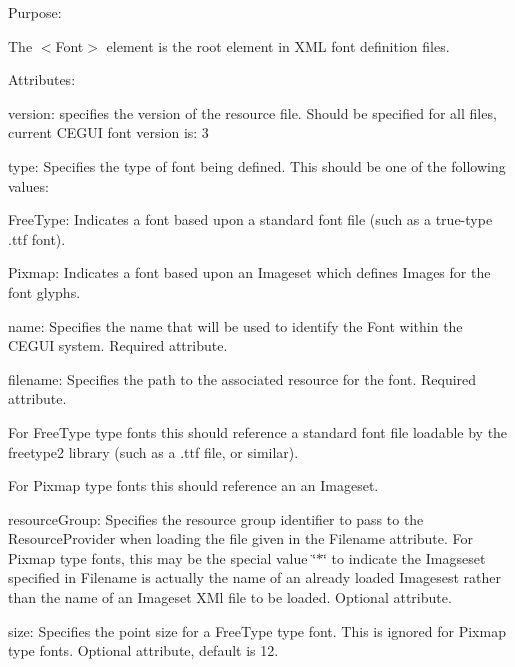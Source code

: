\begin{DoxyItemize}
\item Purpose\+:
\begin{DoxyItemize}
\item The $<$Font$>$ element is the root element in X\+ML font definition files.
\end{DoxyItemize}
\item Attributes\+:
\begin{DoxyItemize}
\item {\ttfamily version\+:} specifies the version of the resource file. Should be specified for all files, current C\+E\+G\+UI font version is\+: 3
\item {\ttfamily type\+:} Specifies the type of font being defined. This should be one of the following values\+:
\begin{DoxyItemize}
\item {\ttfamily Free\+Type\+:} Indicates a font based upon a standard font file (such as a true-\/type \textquotesingle{}.ttf\textquotesingle{} font).
\item {\ttfamily Pixmap\+:} Indicates a font based upon an Imageset which defines Images for the font glyphs.
\end{DoxyItemize}
\item {\ttfamily name\+:} Specifies the name that will be used to identify the Font within the C\+E\+G\+UI system. Required attribute.
\item {\ttfamily filename\+:} Specifies the path to the associated resource for the font. Required attribute.
\begin{DoxyItemize}
\item For Free\+Type type fonts this should reference a standard font file loadable by the freetype2 library (such as a .ttf file, or similar).
\item For Pixmap type fonts this should reference an an Imageset.
\end{DoxyItemize}
\item {\ttfamily resource\+Group\+:} Specifies the resource group identifier to pass to the Resource\+Provider when loading the file given in the {\ttfamily Filename} attribute. For Pixmap type fonts, this may be the special value {\ttfamily \char`\"{}$\ast$\char`\"{}} to indicate the Imagseset specified in {\ttfamily Filename} is actually the name of an already loaded Imagesest rather than the name of an Imageset X\+Ml file to be loaded. Optional attribute.
\item {\ttfamily size\+:} Specifies the point size for a Free\+Type type font. This is ignored for Pixmap type fonts. Optional attribute, default is 12.

\end{DoxyItemize}
\end{DoxyItemize}

